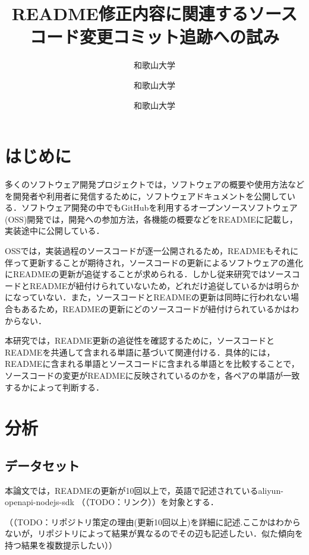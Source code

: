 \documentclass[uplatex,dvipdfmx,a4paper,twocolumn,base=11pt,jbase=11pt,ja=standard]{bxjsarticle}  %
\title{README修正内容に関連するソースコード変更コミット追跡への試み}{Toward tracking source code change commits related to README revision}
\author{和歌山大学}{白﨑 優奈}{Shirasaki Yuna, Wakayama University}
\author{和歌山大学}{伊原 彰紀}{Akinori Ihara, Wakayama University}
\author{和歌山大学}{石岡 直樹}{Naoki Ishioka, Wakayama University}
\begin{document}
\maketitle


\section{はじめに}



多くのソフトウェア開発プロジェクトでは，ソフトウェアの概要や使用方法などを開発者や利用者に発信するために，ソフトウェアドキュメントを公開している．ソフトウェア開発の中でもGitHubを利用するオープンソースソフトウェア(OSS)開発では，開発への参加方法，各機能の概要などをREADMEに記載し，実装途中に公開している．

OSSでは，実装過程のソースコードが逐一公開されるため，READMEもそれに伴って更新することが期待され，ソースコードの更新によるソフトウェアの進化にREADMEの更新が追従することが求められる．しかし従来研究ではソースコードとREADMEが紐付けられていないため，どれだけ追従しているかは明らかになっていない．また，ソースコードとREADMEの更新は同時に行われない場合もあるため，READMEの更新にどのソースコードが紐付けられているかはわからない．

本研究では，README更新の追従性を確認するために，ソースコードとREADMEを共通して含まれる単語に基づいて関連付ける．具体的には，READMEに含まれる単語とソースコードに含まれる単語とを比較することで，ソースコードの変更がREADMEに反映されているのかを，各ペアの単語が一致するかによって判断する．


\section{分析}


\subsection{データセット}



本論文では，READMEの更新が10回以上で，英語で記述されているaliyun-openapi-nodejs-sdk
（（TODO：リンク））を対象とする．

（（TODO：リポジトリ策定の理由(更新10回以上)を詳細に記述.ここかはわからないが，リポジトリによって結果が異なるのでその辺も記述したい．似た傾向を持つ結果を複数提示したい））
\end{document}
